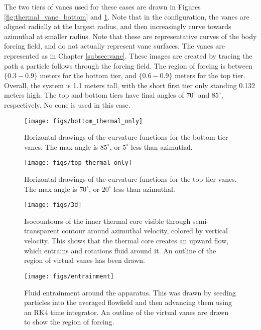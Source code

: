 The two tiers of vanes used for these cases are drawn in Figures
\ref{fig:thermal_vane_bottom} and \ref{fig:thermal_vane_top}.
 Note that in the
configuration, the vanes are 
aligned radially at the largest radius, and then increasingly curve
towards azimuthal at smaller radius. Note that these are representative
curves of the body forcing field, and do not actually represent vane
surfaces. The vanes are represented as in Chapter \ref{subsec:vane}. 
These images are created by tracing the path a particle follows through
the forcing field. The region of forcing is between $\{0.3-0.9\}$ meters
for the bottom tier, and $\{0.6-0.9\}$ meters for the top tier. Overall,
the system is 1.1 meters tall, with the short first tier only standing
0.132 meters high. The top and bottom tiers have final angles of
$70^{\circ}$ and $85^{\circ}$, respectively. No cone is used in this
case. 

\begin{figure}[htb]
\centering
\begin{minipage}{0.45\textwidth}
\centering
 \texttt{[image: figs/bottom\_thermal\_only]}
 \caption{Horizontal drawings of the curvature functions for the bottom tier
 vanes. The max angle is $85^{\circ}$, or $5^{\circ}$ less than azimuthal.}
 \label{fig:thermal_vane_bottom}  
\end{minipage}\hfill
\begin{minipage}{0.45\textwidth}
\centering
\texttt{[image: figs/top\_thermal\_only]}
\caption{Horizontal drawings of the curvature functions for the top tier
 vanes. The max angle is $70^{\circ}$, or $20^{\circ}$ less than
 azimuthal.} 
 \label{fig:thermal_vane_top}  
\end{minipage}
\end{figure}

\begin{figure}[htb]
\centering
\begin{minipage}{0.45\textwidth}
\centering
 \texttt{[image: figs/3d]}
 \caption{Isocountours of the inner thermal core
  visible through semi-transparent contour around azimuthal velocity,
  colored by vertical velocity. This shows that the thermal core creates
 an upward flow, which entrains and rotations fluid around it. An
 outline of the region of virtual vanes has been drawn.}
 \label{fig:thermal}  
\end{minipage}\hfill
\begin{minipage}{0.45\textwidth}
\centering
\texttt{[image: figs/entrainment]}
\caption{Fluid entrainment around the apparatus. This was drawn by
 seeding particles into the averaged flowfield and then advancing them
 using an RK4 time integrator. An outline of the
  virtual vanes are drawn to show the region of forcing.}
 \label{fig:entrain}  
\end{minipage}
\end{figure}


